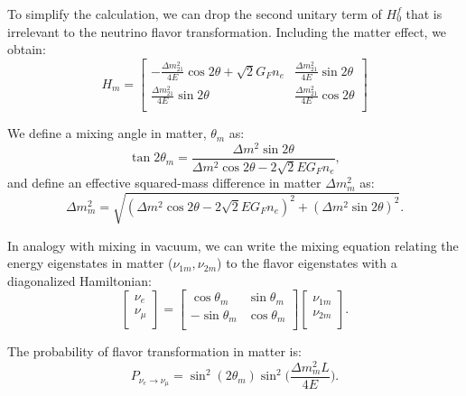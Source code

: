 To simplify the calculation, we can drop the second unitary term of $H^f_0$ that is irrelevant to the neutrino flavor transformation. Including the matter effect, we obtain:
\begin{equation}\label{eq:Hm}
	H_m = \begin{bmatrix}
		-\frac{\Delta m_{21}^2}{4E}\cos 2\theta+\sqrt 2G_Fn_e & \frac{\Delta m_{21}^2}{4E}\sin 2\theta\\
		\frac{\Delta m_{21}^2}{4E}\sin 2\theta &\frac{\Delta m_{21}^2}{4E}\cos 2\theta\\
	\end{bmatrix}
\end{equation}

We define a mixing angle in matter, $\theta_m$ as:
\begin{equation}\label{eq:thetaM}
	\tan 2\theta_m = \frac{\Delta m^2\sin2\theta}{\Delta m^2\cos2\theta-2\sqrt 2E G_Fn_e},
\end{equation}
and define an effective squared-mass difference in matter $\Delta m^2_m$ as:
\begin{equation}
	\Delta m^2_m = \sqrt{(\Delta m^2\cos2\theta - 2\sqrt 2EG_Fn_e)^2+(\Delta m^2\sin2\theta)^2}.
\end{equation}

In analogy with mixing in vacuum, we can write the mixing equation relating the energy eigenstates in matter ($\nu_{1m},\nu_{2m}$) to the flavor eigenstates with a diagonalized Hamiltonian:
\begin{equation}\label{eq:matter_mixing}
	\begin{bmatrix}
		\nu_e\\
		\nu_\mu\\
	\end{bmatrix}
	= \begin{bmatrix}
		\cos\theta_m & \sin\theta_m\\
		-\sin\theta_m & \cos\theta_m \\
	\end{bmatrix}
	\begin{bmatrix}
		\nu_{1m}\\
		\nu_{2m}\\
	\end{bmatrix}.
\end{equation}

The probability of flavor transformation in matter is:
\begin{equation}
	P_{\nu_e\to\nu_{\mu}}=\sin^2(2\theta_m)\sin^2\Big(\frac{\Delta m_m^2L}{4E}\Big).
\end{equation}

